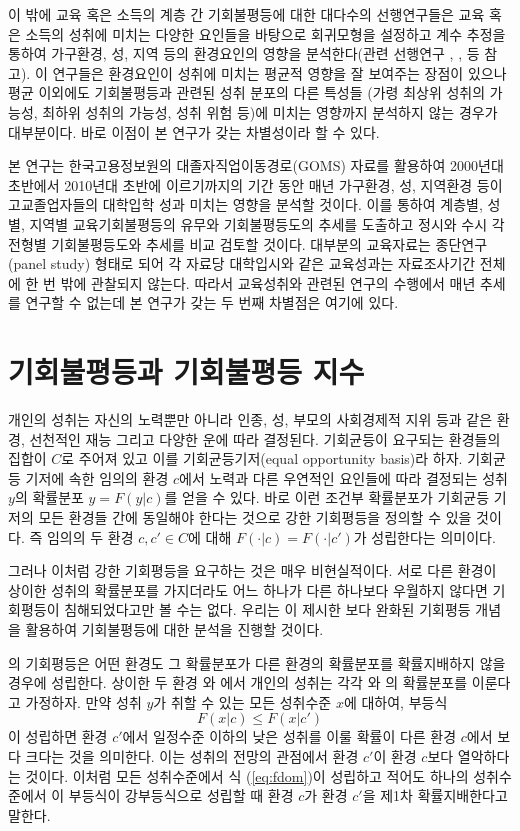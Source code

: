 이 밖에 교육 혹은 소득의 계층 간 기회불평등에 대한 대다수의 선행연구들은 교육 혹은 소득의 성취에 미치는 다양한 요인들을 바탕으로 회귀모형을 설정하고 계수 추정을 통하여 가구환경, 성, 지역 등의 환경요인의 영향을 분석한다(관련 선행연구\citet{knl08} ,\citet{kim11} \citet{kim11}, \citet{ketl14} 등 참고).
이 연구들은 환경요인이 성취에 미치는 평균적 영향을 잘 보여주는 장점이 있으나 평균 이외에도 기회불평등과 관련된 성취 분포의 다른 특성들 (가령 최상위 성취의 가능성, 최하위 성취의 가능성, 성취 위험 등)에 미치는 영향까지 분석하지 않는 경우가 대부분이다.
바로 이점이 본 연구가 갖는 차별성이라 할 수 있다.
   
본 연구는 한국고용정보원의 대졸자직업이동경로(GOMS) 자료를 활용하여 2000년대 초반에서 2010년대 초반에 이르기까지의 기간 동안 매년 가구환경, 성, 지역환경 등이 고교졸업자들의 대학입학 성과 미치는 영향을 분석할 것이다.
이를 통하여 계층별, 성별, 지역별 교육기회불평등의 유무와 기회불평등도의 추세를 도출하고 정시와 수시 각 전형별 기회불평등도와 추세를 비교 검토할 것이다.
대부분의 교육자료는 종단연구(panel study) 형태로 되어 각 자료당 대학입시와 같은 교육성과는 자료조사기간 전체에 한 번 밖에 관찰되지 않는다.
따라서 교육성취와 관련된 연구의 수행에서 매년 추세를 연구할 수 없는데 본 연구가 갖는 두 번째 차별점은 여기에 있다.


\section{기회불평등과 기회불평등 지수}
개인의 성취는 자신의 노력뿐만 아니라 인종, 성, 부모의 사회경제적 지위 등과 같은 환경, 선천적인 재능 그리고 다양한 운에 따라 결정된다.
기회균등이 요구되는 환경들의 집합이 $C$로 주어져 있고 이를 기회균등기저(equal opportunity basis)라 하자.
기회균등 기저에 속한 임의의 환경 $c$에서 노력과 다른 우연적인 요인들에 따라 결정되는 성취 $y$의 확률분포 $y=F(y|c)$를 얻을 수 있다.
바로 이런 조건부 확률분포가 기회균등 기저의 모든 환경들 간에 동일해야 한다는 것으로 강한 기회평등을 정의할 수 있을 것이다.
즉 임의의 두 환경 $c,c' \in C$에 대해 $F(\cdot | c) = F(\cdot | c')$가 성립한다는 의미이다.

그러나 이처럼 강한 기회평등을 요구하는 것은 매우 비현실적이다.
서로 다른 환경이 상이한 성취의 확률분포를 가지더라도 어느 하나가 다른 하나보다 우월하지 않다면 기회평등이 침해되었다고만 볼 수는 없다.
우리는 \citet{letl08, letl09}이 제시한 보다 완화된 기회평등 개념을 활용하여 기회불평등에 대한 분석을 진행할 것이다.

\citet{letl08, letl09}의 기회평등은 어떤 환경도 그 확률분포가 다른 환경의 확률분포를 확률지배하지 않을 경우에 성립한다.
 상이한 두 환경 와 에서 개인의 성취는 각각 와 의 확률분포를 이룬다고 가정하자.
만약 성취 $y$가 취할 수 있는 모든 성취수준 $x$에 대하여, 부등식
\begin{equation}
    F(x | c) \leq F(x | c')
    \label{eq:fdom}
\end{equation}
이 성립하면 환경 $c'$에서 일정수준 이하의 낮은 성취를 이룰 확률이 다른 환경 $c$에서 보다 크다는 것을 의미한다.
 이는 성취의 전망의 관점에서 환경 $c'$이 환경 $c$보다 열악하다는 것이다.
 이처럼 모든 성취수준에서 식 (\ref{eq:fdom})이 성립하고 적어도 하나의 성취수준에서 이 부등식이 강부등식으로 성립할 때 환경 $c$가 환경 $c'$을 제1차 확률지배한다고 말한다.

